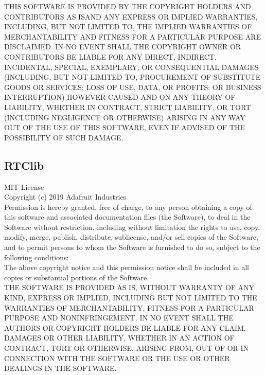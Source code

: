 \begin{appendix}
THIS SOFTWARE IS PROVIDED BY THE COPYRIGHT HOLDERS AND CONTRIBUTORS \glqq AS IS\grqq AND ANY EXPRESS OR IMPLIED WARRANTIES, INCLUDING, BUT NOT LIMITED TO, THE IMPLIED WARRANTIES OF MERCHANTABILITY AND FITNESS FOR A PARTICULAR PURPOSE ARE DISCLAIMED. IN NO EVENT SHALL THE COPYRIGHT OWNER OR CONTRIBUTORS BE LIABLE FOR ANY DIRECT, INDIRECT, INCIDENTAL, SPECIAL, EXEMPLARY, OR CONSEQUENTIAL DAMAGES (INCLUDING, BUT NOT LIMITED TO, PROCUREMENT OF SUBSTITUTE GOODS OR SERVICES; LOSS OF USE, DATA, OR PROFITS; OR BUSINESS INTERRUPTION) HOWEVER CAUSED AND ON ANY THEORY OF LIABILITY, WHETHER IN CONTRACT, STRICT LIABILITY, OR TORT (INCLUDING NEGLIGENCE OR OTHERWISE) ARISING IN ANY WAY OUT OF THE USE OF THIS SOFTWARE, EVEN IF ADVISED OF THE POSSIBILITY OF SUCH DAMAGE. \cite{license_bme280}\\

\subsection{RTClib}
\label{subsec:rtclib_lizenztext}
MIT License\\

Copyright (c) 2019 Adafruit Industries\\

Permission is hereby granted, free of charge, to any person obtaining a copy of this software and associated documentation files (the \glqq Software\grqq), to deal in the Software without restriction, including without limitation the rights to use, copy, modify, merge, publish, distribute, sublicense, and/or sell copies of the Software, and to permit persons to whom the Software is furnished to do so, subject to the following conditions:\\

The above copyright notice and this permission notice shall be included in all copies or substantial portions of the Software.\\

THE SOFTWARE IS PROVIDED \glqq AS IS\grqq, WITHOUT WARRANTY OF ANY KIND, EXPRESS OR IMPLIED, INCLUDING BUT NOT LIMITED TO THE WARRANTIES OF MERCHANTABILITY, FITNESS FOR A PARTICULAR PURPOSE AND NONINFRINGEMENT. IN NO EVENT SHALL THE AUTHORS OR COPYRIGHT HOLDERS BE LIABLE FOR ANY CLAIM, DAMAGES OR OTHER LIABILITY, WHETHER IN AN ACTION OF CONTRACT, TORT OR OTHERWISE, ARISING FROM, OUT OF OR IN CONNECTION WITH THE SOFTWARE OR THE USE OR OTHER DEALINGS IN THE SOFTWARE. \cite{license_rtclib}\\


\end{appendix}
